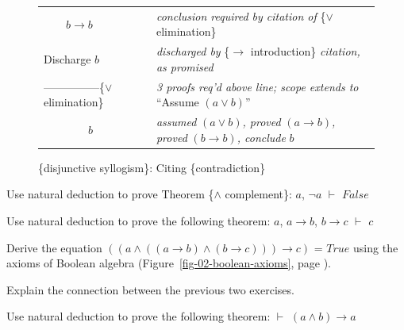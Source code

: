 {{\begin{figure}
\begin{center}
\begin{tabular}{ll}
~~~~$b \rightarrow b$ &\emph{conclusion required by citation of} \{$\vee$ elimination\}\\
Discharge $b$              & \emph{discharged by} \{$\rightarrow$ introduction\} \emph{citation, as promised}\\
---------------\{$\vee$ elimination\}       &\emph{3 proofs req'd above line; scope extends to} ``Assume $(a \vee b)$''\\
~~~~~~~~$b$        &\emph{assumed} $(a \vee b)$\emph{, proved} $(a \rightarrow b)$\emph{, proved} $(b \rightarrow b)$\emph{, conclude }$b$\\
\end{tabular}
\end{center}
\caption{\{disjunctive syllogism\}: Citing \{contradiction\}}
\label{fig:disjunctive-syllogism-nd}
\end{figure}

\begin{ExerciseList}

\Exercise
\label{thm:and-complement}
Use natural deduction to prove
Theorem \{$\wedge$ complement\}: $a$, $\neg a$ $\vdash$ $False$

\Exercise
Use natural deduction to prove the following theorem:
$a$, $a \rightarrow b$, $b \rightarrow c$ $\vdash$ $c$

\Exercise
Derive the equation
$((a \wedge ((a \rightarrow b) \wedge (b \rightarrow c))) \rightarrow c)$ = $True$
using the axioms of Boolean algebra
(Figure~\ref{fig-02-boolean-axioms}, page \pageref{fig-02-boolean-axioms}).

\Exercise
Explain the connection between the previous two exercises.

\Exercise
Use natural deduction to prove the following theorem:
$\vdash$ $(a \wedge b) \rightarrow a$


\end{ExerciseList}}}
